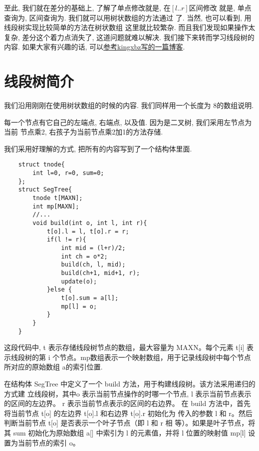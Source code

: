 至此,  我们就在差分的基础上, 了解了单点修改就是, 在$[l..r]$区间修改 
就是, 单点查询为, 
区间查询为. 我们就可以用树状数组的方法通过
了. 当然, 也可以看到, 用线段树实现比较简单的方法在树状数组
这里就比较繁杂. 而且我们发现如果操作太复杂, 差分这个着力点消失了, 这道问题就难以解决. 
我们接下来转而学习线段树的内容. 如果大家有兴趣的话, 可以\href{https://www.luogu.com.cn/blog/kingxbz/shu-zhuang-shuo-zu-zong-ru-men-dao-ru-fen}{参考kingxbz写的一篇博客}.

\section{线段树简介}

 我们沿用刚刚在使用树状数组的时候的内容. 我们同样用一个长度为
8的数组说明. 


每一个节点有它自己的左端点, 右端点, 以及值. 因为是二叉树, 我们采用左节点为当前
节点乘2, 右孩子为当前节点乘2加1的方法存储. 

 我们采用好理解的方式, 把所有的内容写到了一个结构体里面. 
\begin{lstlisting}
    struct tnode{
        int l=0, r=0, sum=0; 
    };
    struct SegTree{
        tnode t[MAXN]; 
        int mp[MAXN];
        //... 
        void build(int o, int l, int r){
            t[o].l = l, t[o].r = r;
            if(l != r){
                int mid = (l+r)/2;
                int ch = o*2;
                build(ch, l, mid);
                build(ch+1, mid+1, r);
                update(o);
            }else {
                t[o].sum = a[l];
                mp[l] = o;
            }
        }
    }
\end{lstlisting}

这段代码中, t 表示存储线段树节点的数组，最大容量为 MAXN。每个元素 t[i] 表示线段树的第 i 个节点。mp数组表示一个映射数组，用于记录线段树中每个节点所对应的原始数组 a的索引位置.  

在结构体 SegTree 中定义了一个 build 方法，用于构建线段树。该方法采用递归的方式建
立线段树，其中o 表示当前节点操作的时哪一个节点, l 表示当前节点表示的区间的左边界。
r 表示当前节点表示的区间的右边界。
在 build 方法中，首先将当前节点 t[o] 的左边界 t[o].l 和右边界 t[o].r 初始化为
传入的参数 l 和 r。然后判断当前节点 t[o] 是否表示一个叶子节点（即 l 和 r 相
等）。如果是叶子节点，将其 sum 初始化为原始数组 a[] 中索引为 l 的元素值，并将 l 
位置的映射值 mp[l] 设置为当前节点的索引 o。


